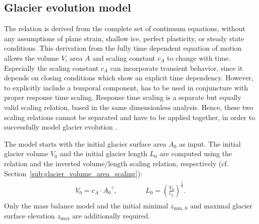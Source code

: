 
    \subsection{Glacier evolution model} %
    \label{sub:glacier_evolution_model}

        The \vas{} relation is derived from the complete set of continuum equations, without any assumptions of plane strain, shallow ice, perfect plasticity, or steady state conditions. This derivation from the fully time dependent equation of motion allows the volume $V$, area $A$ and scaling constant $c_A$ to change with time. Especially the scaling constant $c_A$ can incorporate transient behavior, since it depends on closing conditions which show an explicit time dependency. However, to explicitly include a temporal component, \vas{} has to be used in conjuncture with proper response time scaling. Response time scaling is a separate but equally valid scaling relation, based in the same dimensionless analysis. Hence, these two scaling relations cannot be separated and have to be applied together, in order to successfully model glacier evolution \citep{Bahr2015}.

        The \vas{} model starts with the initial glacier surface area $A_0$ as input. The initial glacier volume $V_0$ and the initial glacier length $L_0$ are computed using the \vas{} relation and the inverted volume/length scaling relation, respectively (cf. Section~\ref{sub:glacier_volume_area_scaling}):
        \begin{align}
            \begin{split}
                V_0 = c_A\cdot {A_0}^\gamma, \qquad\qquad L_0 = \left(\frac{V_0}{c_L}\right)^\frac{1}{q}.
            \end{split}
        \end{align}
        Only the mass balance model and the initial minimal $z_{\text{min, 0}}$ and maximal glacier surface elevation $z_\text{max}$ are additionally required.

